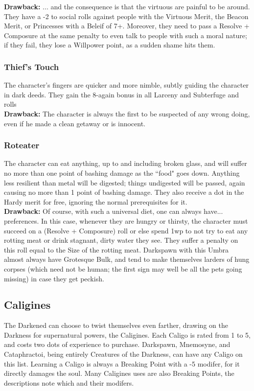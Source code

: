 \noindent \textbf{Drawback:} ... and the consequence is that the virtuous are painful to be around. They have a -2 to social rolls against people with the Virtuous Merit, the Beacon Merit, or Princesses with a Beleif of 7+. Moreover, they need to pass a Resolve + Composure at the same penalty to even talk to people with such a moral nature; if they fail, they lose a Willpower point, as a sudden shame hits them. 

\subsubsection*{Thief's Touch}
The character’s fingers are quicker and more nimble, subtly guiding the character in dark deeds. They gain the 8-again bonus in all Larceny and Subterfuge and rolls\\

\noindent \textbf{Drawback:} The character is always the first to be suspected of any wrong doing, even if he made a clean getaway or is innocent. 
 
\subsubsection*{Roteater}
The character can eat anything, up to and including broken glass, and will suffer no more than one point of bashing damage as the \textquotedblleft food" goes down. Anything less resilient than metal will be digested; things undigested will be passed, again causing no more than 1 point of bashing damage. They also receive a dot in the Hardy merit for free, ignoring the normal prerequisites for it. \\

\noindent \textbf{Drawback:} Of course, with such a universal diet, one can always have... preferences. In this case, whenever they are hungry or thirsty, the character must succeed on a (Resolve + Composure) roll or else spend 1wp to not try to eat any rotting meat or drink stagnant, dirty water they see. They suffer a penalty on this roll equal to the Size of the rotting meat. Darkspawn with this Umbra almost always have Grotesque Bulk, and tend to make themselves larders of hung corpses (which need not be human; the first sign may well be all the pets going missing) in case they get peckish. 

\subsection*{Caligines}
The Darkened can choose to twist themselves even farther, drawing on the Darkness for supernatural powers, the Caligines. Each Caligo is rated from 1 to 5, and costs two dots of experience to purchase. Darkspawn, Mnemosyne, and Cataphractoi, being entirely Creatures of the Darkness, can have any Caligo on this list. Learning a Caligo is always a Breaking Point with a -5 modifer, for it directly damages the soul. Many Caligines uses are also Breaking Points, the descriptions note which and their modifers.

